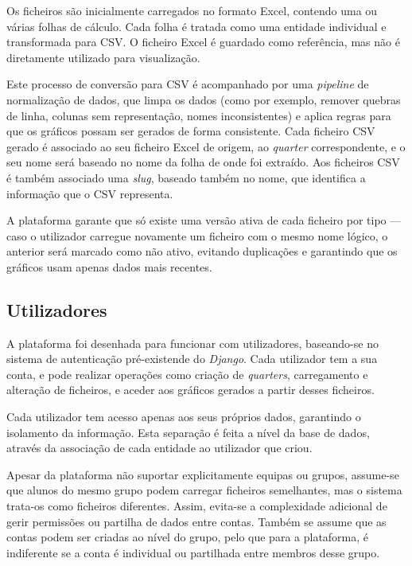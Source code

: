 Os ficheiros são inicialmente carregados no formato Excel, contendo uma ou várias folhas de cálculo. Cada folha é tratada como uma entidade individual e transformada para CSV. O ficheiro Excel é guardado como referência, mas não é diretamente utilizado para visualização.

Este processo de conversão para CSV é acompanhado por uma \textit{pipeline} de normalização de dados, que limpa os dados (como por exemplo, remover quebras de linha, colunas sem representação, nomes inconsistentes) e aplica regras para que os gráficos possam ser gerados de forma consistente. Cada ficheiro CSV gerado é associado ao seu ficheiro Excel de origem, ao \textit{quarter} correspondente, e o seu nome será baseado no nome da folha de onde foi extraído. Aos ficheiros CSV é também associado uma \textit{slug}, baseado também no nome, que identifica a informação que o CSV representa.

A plataforma garante que só existe uma versão ativa de cada ficheiro por tipo — caso o utilizador carregue novamente um ficheiro com o mesmo nome lógico, o anterior será marcado como não ativo, evitando duplicações e garantindo que os gráficos usam apenas dados mais recentes.

\subsection{Utilizadores}

A plataforma foi desenhada para funcionar com utilizadores, baseando-se no sistema de autenticação pré-existende do \textit{Django}. Cada utilizador tem a sua conta, e pode realizar operações como criação de \textit{quarters}, carregamento e alteração de ficheiros, e aceder aos gráficos gerados a partir desses ficheiros.

Cada utilizador tem acesso apenas aos seus próprios dados, garantindo o isolamento da informação. Esta separação é feita a nível da base de dados, através da associação de cada entidade ao utilizador que criou.

Apesar da plataforma não suportar explicitamente equipas ou grupos, assume-se que alunos do mesmo grupo podem carregar ficheiros semelhantes, mas o sistema trata-os como ficheiros diferentes. Assim, evita-se a complexidade adicional de gerir permissões ou partilha de dados entre contas. Também se assume que as contas podem ser criadas ao nível do grupo, pelo que para a plataforma, é indiferente se a conta é individual ou partilhada entre membros desse grupo.

